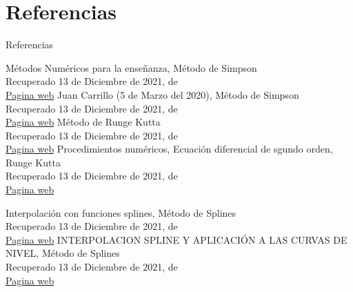 \documentclass[11pt]{beamer}
\begin{document}
	\section{Referencias}
		\begin{frame}{Referencias}
			\centering
			\begin{thebibliography}{10}
				 Métodos Numéricos para la enseñanza, Método de Simpson\\ 
								Recuperado 13 de Diciembre de 2021, de \\
								\href{https://multimedia.uned.ac.cr/pem/metodos_numericos_ensenanza/glosario/mod4.html}{Pagina web}
				 Juan Carrillo (5 de Marzo del 2020), Método de Simpson\\ 
								Recuperado 13 de Diciembre de 2021, de \\
								\href{https://www.freecodecamp.org/espanol/news/la-regla-de-simpson-la-formula-y-como-funciona/}{Pagina web}
				 Método de Runge Kutta\\
								Recuperado 13 de Diciembre de 2021, de \\
								\href{https://esimecuanalisisnumerico.wordpress.com/2014/05/06/metodo-numerico-de-runge-kutta/}{Pagina web}
					Procedimientos numéricos, Ecuación diferencial de sgundo orden, Runge Kutta\\
								Recuperado 13 de Diciembre de 2021, de \\
								\href{http://www.sc.ehu.es/sbweb/fisica_/numerico/diferencial/segundo.html}{Pagina web}
			\end{thebibliography}
		\end{frame}

		\begin{frame}
			\centering
			\begin{thebibliography}{10}
					Interpolación con funciones splines, Método de Splines\\
								Recuperado 13 de Diciembre de 2021, de \\
								\href{http://www4.ujaen.es/~angelcid/Archivos/An_Met_Num_INFORMATICA/Splines.pdf}{Pagina web}
				 INTERPOLACION SPLINE Y APLICACIÓN A LAS CURVAS DE NIVEL, Método de Splines\\ 
								Recuperado 13 de Diciembre de 2021, de \\
								\href{http://diposit.ub.edu/dspace/bitstream/2445/122512/2/memoria.pdf}{Pagina web}
			\end{thebibliography}
		\end{frame}
\end{document}
